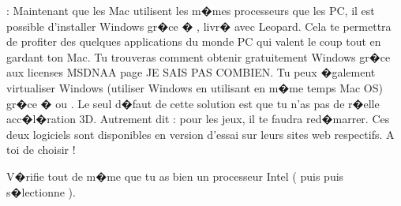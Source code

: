\noindent {} : Maintenant que les Mac utilisent les m�mes processeurs que les PC, il est possible d'installer Windows gr�ce � , livr� avec Leopard. Cela te permettra de profiter des quelques applications du monde PC qui valent le coup tout en gardant ton Mac. Tu trouveras comment obtenir gratuitement Windows gr�ce aux licenses MSDNAA page JE SAIS PAS COMBIEN. Tu peux �galement virtualiser Windows (utiliser Windows en utilisant en m�me temps Mac OS) gr�ce �  ou . Le seul d�faut de cette solution est que tu n'as pas de r�elle acc�l�ration 3D. Autrement dit : pour les jeux, il te faudra red�marrer. Ces deux logiciels sont disponibles en version d'essai sur leurs sites web respectifs. A toi de choisir !

V�rifie tout de m�me que tu as bien un processeur Intel ( puis puis s�lectionne ). 